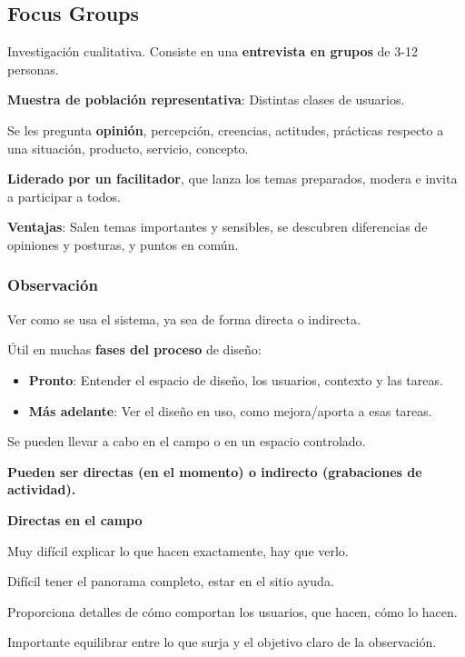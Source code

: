 \documentclass[12pt]{report} %
\begin{document}
\subsection{Focus Groups}

Investigación cualitativa. Consiste en una \textbf{entrevista en grupos}
de 3-12 personas.

\textbf{Muestra de población representativa}: Distintas clases de
usuarios.

Se les pregunta \textbf{opinión}, percepción, creencias, actitudes,
prácticas respecto a una situación, producto, servicio, concepto.

\textbf{Liderado por un facilitador}, que lanza los temas preparados,
modera e invita a participar a todos.

\textbf{Ventajas}: Salen temas importantes y sensibles, se descubren
diferencias de opiniones y posturas, y puntos en común.

\hypertarget{observaciuxf3n}{%
\subsubsection{Observación}\label{observaciuxf3n}}

Ver como se usa el sistema, ya sea de forma directa o indirecta.

Útil en muchas \textbf{fases del proceso} de diseño:

\begin{itemize}

\item
  \textbf{Pronto}: Entender el espacio de diseño, los usuarios, contexto
  y las tareas.
\item
  \textbf{Más adelante}: Ver el diseño en uso, como mejora/aporta a esas
  tareas.
\end{itemize}

Se pueden llevar a cabo en el campo o en un espacio controlado.

\textbf{Pueden ser directas (en el momento) o indirecto (grabaciones de
actividad).}

\textbf{Directas en el campo}

Muy difícil explicar lo que hacen exactamente, hay que verlo.

Difícil tener el panorama completo, estar en el sitio ayuda.

Proporciona detalles de cómo comportan los usuarios, que hacen, cómo lo
hacen.

Importante equilibrar entre lo que surja y el objetivo claro de la
observación.
\end{document}
